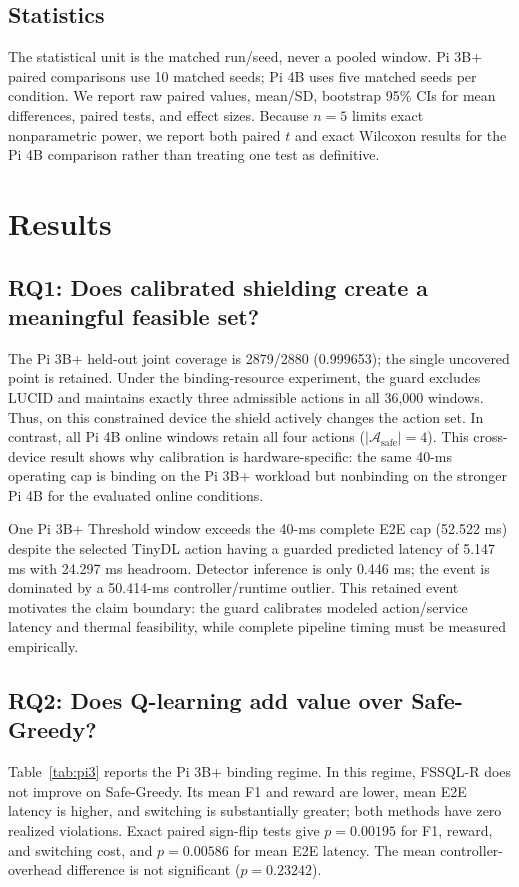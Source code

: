\documentclass[journal]{IEEEtran}
\newcommand{\Asafe}{\mathcal{A}_{\mathrm{safe}}}
\begin{document}
\subsection{Statistics}
The statistical unit is the matched run/seed, never a pooled window. Pi 3B+ paired comparisons use 10 matched seeds; Pi 4B uses five matched seeds per condition. We report raw paired values, mean/SD, bootstrap 95\% CIs for mean differences, paired tests, and effect sizes. Because $n=5$ limits exact nonparametric power, we report both paired $t$ and exact Wilcoxon results for the Pi 4B comparison rather than treating one test as definitive.

\section{Results}
\subsection{RQ1: Does calibrated shielding create a meaningful feasible set?}
The Pi 3B+ held-out joint coverage is 2879/2880 (0.999653); the single uncovered point is retained. Under the binding-resource experiment, the guard excludes LUCID and maintains exactly three admissible actions in all 36,000 windows. Thus, on this constrained device the shield actively changes the action set. In contrast, all Pi 4B online windows retain all four actions ($|\Asafe|=4$). This cross-device result shows why calibration is hardware-specific: the same 40-ms operating cap is binding on the Pi 3B+ workload but nonbinding on the stronger Pi 4B for the evaluated online conditions.

One Pi 3B+ Threshold window exceeds the 40-ms complete E2E cap (52.522 ms) despite the selected TinyDL action having a guarded predicted latency of 5.147 ms with 24.297 ms headroom. Detector inference is only 0.446 ms; the event is dominated by a 50.414-ms controller/runtime outlier. This retained event motivates the claim boundary: the guard calibrates modeled action/service latency and thermal feasibility, while complete pipeline timing must be measured empirically.

\subsection{RQ2: Does Q-learning add value over Safe-Greedy?}
Table~\ref{tab:pi3} reports the Pi 3B+ binding regime. In this regime, FSSQL-R does not improve on Safe-Greedy. Its mean F1 and reward are lower, mean E2E latency is higher, and switching is substantially greater; both methods have zero realized violations. Exact paired sign-flip tests give $p=0.00195$ for F1, reward, and switching cost, and $p=0.00586$ for mean E2E latency. The mean controller-overhead difference is not significant ($p=0.23242$).
\end{document}
